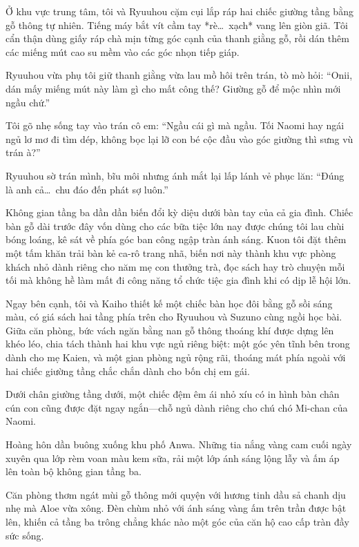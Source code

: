 \documentclass[../main.tex]{subfiles}
\begin{document}
Ở khu vực trung tâm, tôi và Ryuuhou cặm cụi lắp ráp hai chiếc giường tầng bằng gỗ thông tự nhiên. Tiếng máy bắt vít cầm tay *rè\dots\ xạch* vang lên giòn giã. Tôi cẩn thận dùng giấy ráp chà mịn từng góc cạnh của thanh giằng gỗ, rồi dán thêm các miếng mút cao su mềm vào các góc nhọn tiếp giáp.

Ryuuhou vừa phụ tôi giữ thanh giằng vừa lau mồ hôi trên trán, tò mò hỏi: ``Onii, dán mấy miếng mút này làm gì cho mất công thế? Giường gỗ để mộc nhìn mới ngầu chứ.''

Tôi gõ nhẹ sống tay vào trán cô em: ``Ngầu cái gì mà ngầu. Tối Naomi hay ngái ngủ lơ mơ đi tìm dép, không bọc lại lỡ con bé cộc đầu vào góc giường thì sưng vù trán à?''

Ryuuhou sờ trán mình, bĩu môi nhưng ánh mắt lại lấp lánh vẻ phục lăn: ``Đúng là anh cả\dots\ chu đáo đến phát sợ luôn.''

Không gian tầng ba dần dần biến đổi kỳ diệu dưới bàn tay của cả gia đình. Chiếc bàn gỗ dài trước đây vốn dùng cho các bữa tiệc lớn nay được chúng tôi lau chùi bóng loáng, kê sát về phía góc ban công ngập tràn ánh sáng. Kuon tôi đặt thêm một tấm khăn trải bàn kẻ ca-rô trang nhã, biến nơi này thành khu vực phòng khách nhỏ dành riêng cho năm mẹ con thưởng trà, đọc sách hay trò chuyện mỗi tối mà không hề làm mất đi công năng tổ chức tiệc gia đình khi có dịp lễ hội lớn.

Ngay bên cạnh, tôi và Kaiho thiết kế một chiếc bàn học đôi bằng gỗ sồi sáng màu, có giá sách hai tầng phía trên cho Ryuuhou và Suzuno cùng ngồi học bài. Giữa căn phòng, bức vách ngăn bằng nan gỗ thông thoáng khí được dựng lên khéo léo, chia tách thành hai khu vực ngủ riêng biệt: một góc yên tĩnh bên trong dành cho mẹ Kaien, và một gian phòng ngủ rộng rãi, thoáng mát phía ngoài với hai chiếc giường tầng chắc chắn dành cho bốn chị em gái.

Dưới chân giường tầng dưới, một chiếc đệm êm ái nhỏ xíu có in hình bàn chân cún con cũng được đặt ngay ngắn—chỗ ngủ dành riêng cho chú chó Mi-chan của Naomi.

\ct

Hoàng hôn dần buông xuống khu phố Anwa. Những tia nắng vàng cam cuối ngày xuyên qua lớp rèm voan màu kem sữa, rải một lớp ánh sáng lộng lẫy và ấm áp lên toàn bộ không gian tầng ba.

Căn phòng thơm ngát mùi gỗ thông mới quyện với hương tinh dầu sả chanh dịu nhẹ mà Aloe vừa xông. Đèn chùm nhỏ với ánh sáng vàng ấm trên trần được bật lên, khiến cả tầng ba trông chẳng khác nào một góc của căn hộ cao cấp tràn đầy sức sống.
\end{document}

